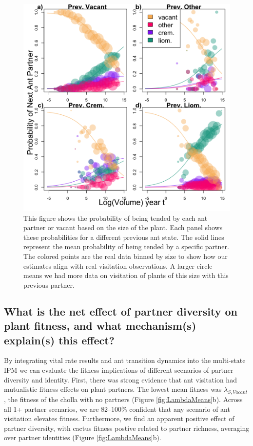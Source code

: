 \documentclass[11pt]{article}
\begin{document}
\begin{figure}[H]
	\includegraphics[width=0.95\linewidth]{Figures/AntSizeMulti.png}
	\caption{This figure shows the probability of being tended by each ant partner or vacant based on the size of the plant. Each panel shows these probabilities for a different previous ant state. The solid lines represent the mean probability of being tended by a specific partner. The colored points are the real data binned by size to show how our estimates align with real visitation observations. A larger circle means we had more data on visitation of plants of this size with this previous partner.}
	\label{fig:Ant_Transition}
\end{figure}

\subsection*{What is the net effect of partner diversity on plant fitness, and what mechanism(s) explain(s) this effect?}
By integrating vital rate results and ant transition dynamics into the multi-state IPM we can evaluate the fitness implications of different scenarios of partner diversity and identity. 
First, there was strong evidence that ant visitation had mutualistic fitness effects on plant partners. 
The lowest mean fitness was $\lambda_{S,Vacant}$, the fitness of the cholla with no partners (Figure \ref{fig:LambdaMeans}b).
Across all 1+ partner scenarios, we are 82--100\% confident that any scenario of ant visitation elevates fitness. 
Furthermore, we find an apparent positive effect of partner diversity, with cactus fitness postive related to partner richness, averaging over partner identities (Figure \ref{fig:LambdaMeans}b).
\end{document}
